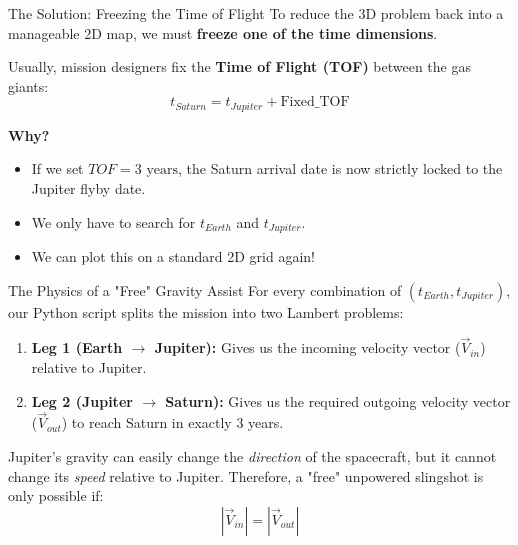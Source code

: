 \documentclass[aspectratio=169]{beamer}
\begin{document}
\begin{frame}{The Solution: Freezing the Time of Flight}
    To reduce the 3D problem back into a manageable 2D map, we must \textbf{freeze one of the time dimensions}. 
    
    \vspace{0.5cm}
    Usually, mission designers fix the \textbf{Time of Flight (TOF)} between the gas giants:
    \begin{equation}
        t_{Saturn} = t_{Jupiter} + \text{Fixed\_TOF}
    \end{equation}
    
    \vspace{0.3cm}
    \textbf{Why?} 
    \begin{itemize}
        \item If we set $TOF = 3 \text{ years}$, the Saturn arrival date is now strictly locked to the Jupiter flyby date.
        \item We only have to search for $t_{Earth}$ and $t_{Jupiter}$. 
        \item We can plot this on a standard 2D grid again!
    \end{itemize}
\end{frame}

\begin{frame}{The Physics of a "Free" Gravity Assist}
    For every combination of $(t_{Earth}, t_{Jupiter})$, our Python script splits the mission into two Lambert problems:
    \vspace{0.3cm}
    \begin{enumerate}
        \item \textbf{Leg 1 (Earth $\rightarrow$ Jupiter):} Gives us the incoming velocity vector ($\vec{V}_{in}$) relative to Jupiter.
        \item \textbf{Leg 2 (Jupiter $\rightarrow$ Saturn):} Gives us the required outgoing velocity vector ($\vec{V}_{out}$) to reach Saturn in exactly 3 years.
    \end{enumerate}
    
    \vspace{0.3cm}
    \begin{tcolorbox}[colback=blue!5!white,colframe=blue!75!black,title=Energy Conservation at Jupiter]
        Jupiter's gravity can easily change the \textit{direction} of the spacecraft, but it cannot change its \textit{speed} relative to Jupiter. Therefore, a "free" unpowered slingshot is only possible if:
        $$ |\vec{V}_{in}| = |\vec{V}_{out}| $$
    \end{tcolorbox}
\end{frame}
\end{document}
